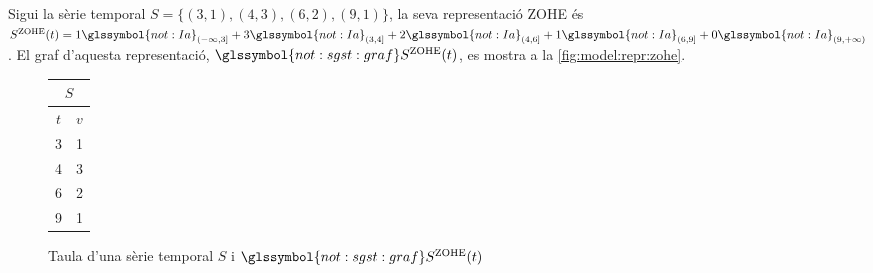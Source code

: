 \begin{example}
  Sigui la sèrie temporal $S=\{ (3,1), (4,3), (6,2), (9,1) \}$, la
  seva representació ZOHE és $S^\text{ZOHE}(t) =
  1\glssymbol{not:Ia}_{(-\infty,3]} +3\glssymbol{not:Ia}_{(3,4]}
  +2\glssymbol{not:Ia}_{(4,6]} +1\glssymbol{not:Ia}_{(6,9]}
  +0\glssymbol{not:Ia}_{(9,+\infty)}$. El graf d'aquesta
  representació, $\glssymbol{not:sgst:graf} S^\text{ZOHE}(t)$, es
  mostra a la \autoref{fig:model:repr:zohe}.


  \begin{figure}[tp]
  \centering
  \begin{tabular}[c]{|c|c|}
    \multicolumn{2}{c}{$S$} \\ \hline
    $t$  & $v$ \\ \hline
    3  & 1 \\
    4  & 3 \\
    6  & 2 \\
    9  & 1 \\ \hline
  \end{tabular} \qquad
   \caption{Taula d'una sèrie temporal $S$ i
     $\glssymbol{not:sgst:graf} S^\text{ZOHE}(t)$}
  \label{fig:model:repr:zohe}
  \end{figure}
\end{example}



